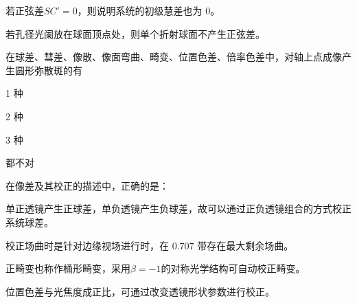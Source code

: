 \documentclass[standard, analysis, notocnum]{ExBook}
\newcommand{\answerarea}[1][8cm]{%
  \par\vspace{2mm}%
  \noindent{\color{themeColor!35}\rule{\linewidth}{0.4pt}}\par
  \noindent\begin{minipage}[t][#1][t]{\linewidth}\vspace{0pt}\end{minipage}\par
  \noindent{\color{themeColor!35}\rule{\linewidth}{0.4pt}}\par
}
\begin{document}
\begin{qitems}
\begin{bbox}
\par\noindent\hspace{2em}若正弦差$SC'=0$，则说明系统的初级慧差也为 0。
\par\noindent\hspace{2em}若孔径光阑放在球面顶点处，则单个折射球面不产生正弦差。
\answerarea[3.5cm]
\end{bbox}
\begin{bbox}
\qitem 在球差、彗差、像散、像面弯曲、畸变、位置色差、倍率色差中，对轴上点成像产生圆形弥散斑的有
\par\noindent\hspace{2em}1 种
\par\noindent\hspace{2em}2 种
\par\noindent\hspace{2em}3 种
\par\noindent\hspace{2em}都不对
\answerarea[3.5cm]
\end{bbox}
\begin{bbox}
\qitem 在像差及其校正的描述中，正确的是：
\par\noindent\hspace{2em}单正透镜产生正球差，单负透镜产生负球差，故可以通过正负透镜组合的方式校正系统球差。
\par\noindent\hspace{2em}校正场曲时是针对边缘视场进行时，在 0.707 带存在最大剩余场曲。
\par\noindent\hspace{2em}正畸变也称作桶形畸变，采用$\beta =-1$的对称光学结构可自动校正畸变。
\par\noindent\hspace{2em}位置色差与光焦度成正比，可通过改变透镜形状参数进行校正。
\answerarea[3.5cm]
\end{bbox}
\end{qitems}
\end{document}
